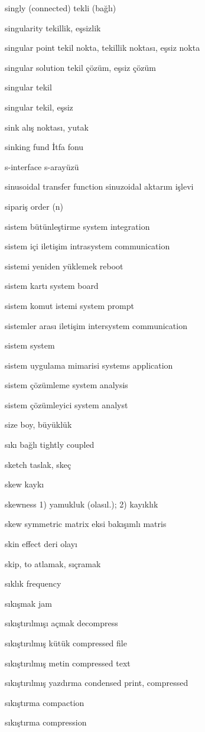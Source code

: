 \documentclass[12pt,fleqn]{article}\usepackage{../../common}
\begin{document}
singly (connected) tekli (bağlı)

singularity tekillik, eşsizlik

singular point tekil nokta, tekillik noktası,  eşsiz nokta

singular solution tekil çözüm, eşsiz çözüm

singular tekil

singular tekil, eşsiz

sink alış noktası, yutak

sinking fund İtfa fonu

s-interface s-arayüzü

sinusoidal transfer function sinuzoidal aktarım işlevi

sipariş order (n)

sistem bütünleştirme system integration

sistem içi iletişim intrasystem communication

sistemi yeniden yüklemek reboot

sistem kartı system board

sistem komut istemi system prompt

sistemler arası iletişim intersystem communication

sistem system

sistem uygulama mimarisi systems application

sistem çözümleme system analysis

sistem çözümleyici system analyst

size boy, büyüklük

sıkı bağlı tightly coupled

sketch taslak, skeç

skew kaykı

skewness 1) yamukluk (olasıl.); 2) kayıklık

skew symmetric matrix eksi bakışımlı matris

skin effect deri olayı

skip, to atlamak, sıçramak

sıklık frequency

sıkışmak jam

sıkıştırılmışı açmak decompress

sıkıştırılmış kütük compressed file

sıkıştırılmış metin compressed text

sıkıştırılmış yazdırma condensed print, compressed

sıkıştırma compaction

sıkıştırma compression
\end{document}
